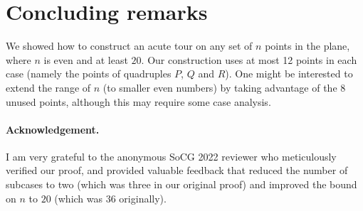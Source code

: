 \documentclass[11pt,letter]{article}
\begin{document}
\section{Concluding remarks}
We showed how to construct an acute tour on any set of $n$ points in the plane, where $n$ is even and at least $20$. Our construction uses at most 12 points in each case (namely the points of quadruples $P$, $Q$ and $R$). One might be interested to extend the range of $n$ (to smaller even numbers) by taking advantage of the $8$ unused points, although this may require some case analysis. 

\paragraph{Acknowledgement.} %
I am very grateful to the anonymous SoCG 2022 reviewer who meticulously verified our proof, and provided valuable feedback that reduced the number of subcases to two (which was three in our original proof) and improved the bound on $n$ to $20$ (which was $36$ originally). 



\end{document}
